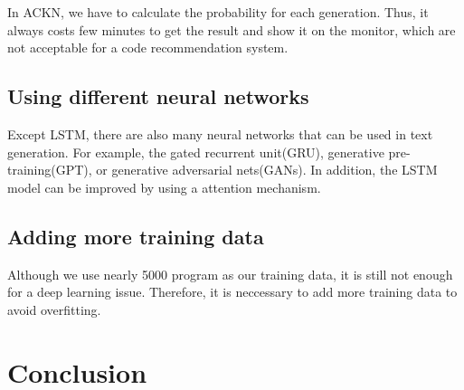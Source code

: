 \documentclass[PRO,english]{ipsj}
\begin{document}
In ACKN, we have to calculate the probability for each generation. Thus, it always costs few minutes to get the result and show it on the monitor, which are not acceptable for a code recommendation system. 


\subsection{Using different neural networks}
Except LSTM, there are also many neural networks that can be used in text generation. For example, the gated recurrent unit(GRU), generative pre-training(GPT), or generative adversarial nets(GANs). In addition, the LSTM model can be improved by using a attention mechanism. 

\subsection{Adding more training data}
Although we use nearly 5000 program as our training data, it is still not enough for a deep learning issue. Therefore, it is neccessary to add more training data to avoid overfitting.



\section{Conclusion}







\end{document}
